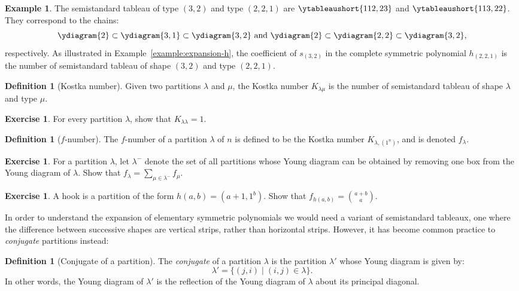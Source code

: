 \documentclass[11pt]{amsproc}
\theoremstyle{definition}
\newtheorem{definition}[theorem]{Definition}
\theoremstyle{example}
\newtheorem{example}[theorem]{Example}
\newtheorem{exercise}[theorem]{Exercise}
\begin{document}
\begin{example}
  The semistandard tableau of type $(3,2)$ and type $(2,2,1)$ are $\ytableaushort{112,23}$ and $\ytableaushort{113,22}$.
  They correspond to the chains:
  \begin{displaymath}
    \ydiagram{2}\subset \ydiagram{3,1}\subset \ydiagram{3,2} \text{ and } \ydiagram{2}\subset \ydiagram{2,2}\subset \ydiagram{3,2},
  \end{displaymath}
  respectively.
  As illustrated in Example~\ref{example:expansion-h}, the coefficient of $s_{(3,2)}$ in the complete symmetric polynomial $h_{(2,2,1)}$ is the number of semistandard tableau of shape $(3,2)$ and type $(2,2,1)$.
\end{example}
\begin{definition}
  [Kostka number]
  Given two partitions $\lambda$ and $\mu$, the Kostka number $K_{\lambda\mu}$ is the number of semistandard tableau of shape $\lambda$ and type $\mu$.
\end{definition}
\begin{exercise}
  \label{exercise:unit-kostka}
  For every partition $\lambda$, show that $K_{\lambda\lambda}=1$.
\end{exercise}
\begin{definition}
  [$f$-number]
  The $f$-number of a partition $\lambda$ of $n$ is defined to be the Kostka number $K_{\lambda,(1^n)}$, and is denoted $f_\lambda$.
\end{definition}
\begin{exercise}
  For a partition $\lambda$, let $\lambda^-$ denote the set of all partitions whose Young diagram can be obtained by removing one box from the Young diagram of $\lambda$.
  Show that $f_\lambda = \sum_{\mu\in \lambda^-} f_\mu$.
\end{exercise}
\begin{exercise}
  A hook is a partition of the form $h(a,b)=(a+1,1^b)$.
  Show that $f_{h(a,b)}=\binom{a+b}a$.
\end{exercise}
In order to understand the expansion of elementary symmetric polynomials we would need a variant of semistandard tableaux, one where the difference between successive shapes are vertical strips, rather than horizontal strips.
However, it has become common practice to \emph{conjugate} partitions instead:
\begin{definition}
  [Conjugate of a partition]
  The \emph{conjugate} of a partition $\lambda$ is the partition $\lambda'$ whose Young diagram is given by:
  \begin{displaymath}
    \lambda' = \{(j,i)\mid (i, j)\in \lambda\}.
  \end{displaymath}
  In other words, the Young diagram of $\lambda'$ is the reflection of the Young diagram of $\lambda$ about its principal diagonal.
\end{definition}
\end{document}
